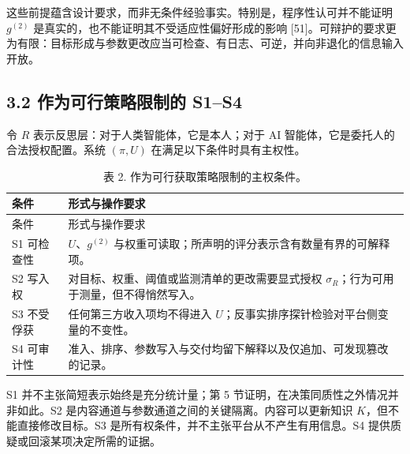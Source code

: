 \documentclass[
  chinese,
  11pt]{article}
\begin{document}
这些前提蕴含设计要求，而非无条件经验事实。特别是，程序性认可并不能证明 \(g^{(2)}\) 是真实的，也不能证明其不受适应性偏好形成的影响 {[}51{]}。可辩护的要求更为有限：目标形成与参数更改应当可检查、有日志、可逆，并向非退化的信息输入开放。

\subsection{3.2 作为可行策略限制的 S1--S4}\label{ux4f5cux4e3aux53efux884cux7b56ux7565ux9650ux5236ux7684-s1s4}

令 \(R\) 表示反思层：对于人类智能体，它是本人；对于 AI 智能体，它是委托人的合法授权配置。系统 \((\pi,U)\) 在满足以下条件时具有主权性。

\begin{longtable}[]{@{}
  >{\raggedright\arraybackslash}p{}
  >{\raggedright\arraybackslash}p{}@{}}
\caption{表 2. 作为可行获取策略限制的主权条件。}\tabularnewline
\toprule\noalign{}
\begin{minipage}[b]{\linewidth}\raggedright
条件
\end{minipage} & \begin{minipage}[b]{\linewidth}\raggedright
形式与操作要求
\end{minipage} \\
\midrule\noalign{}
\endfirsthead
\toprule\noalign{}
\begin{minipage}[b]{\linewidth}\raggedright
条件
\end{minipage} & \begin{minipage}[b]{\linewidth}\raggedright
形式与操作要求
\end{minipage} \\
\midrule\noalign{}
\endhead
\bottomrule\noalign{}
\endlastfoot
S1 可检查性 & \(U\)、\(g^{(2)}\) 与权重可读取；所声明的评分表示含有数量有界的可解释项。 \\
S2 写入权 & 对目标、权重、阈值或监测清单的更改需要显式授权 \(\sigma_R\)；行为可用于测量，但不得悄然写入。 \\
S3 不受俘获 & 任何第三方收入项均不得进入 \(U\)；反事实排序探针检验对平台侧变量的不变性。 \\
S4 可审计性 & 准入、排序、参数写入与交付均留下解释以及仅追加、可发现篡改的记录。 \\
\end{longtable}

S1 并不主张简短表示始终是充分统计量；第 5 节证明，在决策同质性之外情况并非如此。S2 是内容通道与参数通道之间的关键隔离。内容可以更新知识 \(K\)，但不能直接修改目标。S3 是所有权条件，并不主张平台从不产生有用信息。S4 提供质疑或回滚某项决定所需的证据。
\end{document}
